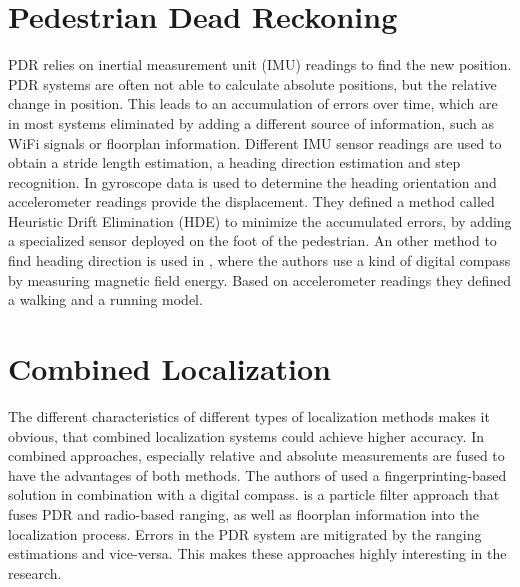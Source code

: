 \section{Pedestrian Dead Reckoning}
PDR relies on inertial measurement unit (IMU) readings to find the new position. PDR systems are often not able to calculate absolute positions, but the relative change in position. This leads to an accumulation of errors over time, which are in most systems eliminated by adding a different source of information, such as WiFi signals or floorplan information. Different IMU sensor readings are used to obtain a stride length estimation, a heading direction estimation and step recognition. In \cite{Borestein} gyroscope data is used to determine the heading orientation and accelerometer readings provide the displacement. They defined a method called Heuristic Drift Elimination (HDE) to minimize the accumulated errors, by adding a specialized sensor deployed on the foot of the pedestrian. An other method to find heading direction is used in \cite{Kakiuchi}, where the authors use a kind of digital compass by measuring magnetic field energy. Based on accelerometer readings they defined a walking and a running model.

\section{Combined Localization}
The different characteristics of different types of localization methods makes it obvious, that combined localization systems could achieve higher accuracy. In combined approaches, especially relative and absolute measurements are fused to have the advantages of both methods. The authors of \cite{Nagpal} used a fingerprinting-based solution in combination with a digital compass. \cite{Carrera} is a particle filter approach that fuses PDR and radio-based ranging, as well as floorplan information into the localization process. Errors in the PDR system are mitigrated by the ranging estimations and vice-versa. This makes these approaches highly interesting in the research.
